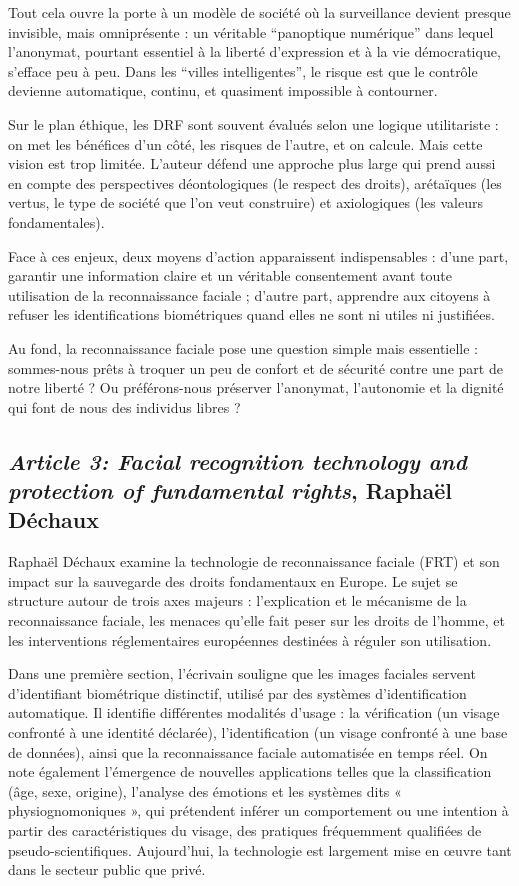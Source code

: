 \documentclass[11pt]{article}
\begin{document}
Tout cela ouvre la porte à un modèle de société où la surveillance devient presque invisible, mais omniprésente : un véritable 
“panoptique numérique” dans lequel l’anonymat, pourtant essentiel à la liberté d’expression et à la vie démocratique, s’efface 
peu à peu. Dans les “villes intelligentes”, le risque est que le contrôle devienne automatique, continu, et quasiment impossible 
à contourner.

Sur le plan éthique, les DRF sont souvent évalués selon une logique utilitariste : on met les bénéfices d’un côté, les risques 
de l’autre, et on calcule. Mais cette vision est trop limitée. L’auteur défend une approche plus large qui prend aussi en compte 
des perspectives déontologiques (le respect des droits), arétaïques (les vertus, le type de société que l’on veut construire) et 
axiologiques (les valeurs fondamentales).

Face à ces enjeux, deux moyens d’action apparaissent indispensables : d’une part, garantir une information claire et un 
véritable consentement avant toute utilisation de la reconnaissance faciale ; d’autre part, apprendre aux citoyens à refuser les 
identifications biométriques quand elles ne sont ni utiles ni justifiées.

Au fond, la reconnaissance faciale pose une question simple mais essentielle : sommes-nous prêts à troquer un peu de confort et 
de sécurité contre une part de notre liberté ? Ou préférons-nous préserver l’anonymat, l’autonomie et la dignité qui font de 
nous des individus libres ?

\subsection{\textit{Article 3: Facial recognition technology and protection of fundamental rights}, Raphaël Déchaux}
Raphaël Déchaux examine la technologie de reconnaissance faciale (FRT) et son impact sur la sauvegarde des droits fondamentaux 
en Europe. Le sujet se structure autour de trois axes majeurs : l'explication et le mécanisme de la reconnaissance faciale, les 
menaces qu'elle fait peser sur les droits de l'homme, et les interventions réglementaires européennes destinées à réguler son 
utilisation.

Dans une première section, l'écrivain souligne que les images faciales servent d'identifiant biométrique distinctif, utilisé par 
des systèmes d'identification automatique. Il identifie différentes modalités d'usage : la vérification (un visage confronté à 
une identité déclarée), l'identification (un visage confronté à une base de données), ainsi que la reconnaissance faciale 
automatisée en temps réel. On note également l'émergence de nouvelles applications telles que la classification (âge, sexe, 
origine), l'analyse des émotions et les systèmes dits « physiognomoniques », qui prétendent inférer un comportement ou une 
intention à partir des caractéristiques du visage, des pratiques fréquemment qualifiées de pseudo-scientifiques. Aujourd'hui, la 
technologie est largement mise en œuvre tant dans le secteur public que privé.
\end{document}
